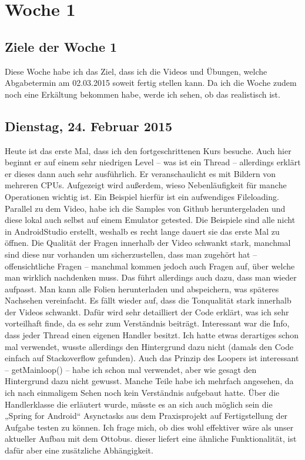 \documentclass[12pt,a4paper,bibliography=totocnumbered,listof=totocnumbered]{scrartcl}
\begin{document}
\pagebreak

\section{Woche 1}

\subsection{Ziele der Woche 1}
Diese Woche habe ich das Ziel, dass ich die Videos und Übungen, welche Abgabetermin am 02.03.2015 soweit fertig stellen kann. Da ich die Woche zudem noch eine Erkältung bekommen habe, werde ich sehen, ob das realistisch ist.

\subsection{Dienstag, 24. Februar 2015}
Heute ist das erste Mal, dass ich den fortgeschrittenen Kurs besuche. Auch hier beginnt er auf einem sehr niedrigen Level – was ist ein Thread – allerdings erklärt er dieses dann auch sehr ausführlich. Er veranschaulicht es mit Bildern von mehreren CPUs. Aufgezeigt wird außerdem, wieso Nebenläufigkeit für manche Operationen wichtig ist. Ein Beispiel hierfür ist ein aufwendiges Fileloading. 
Parallel zu dem Video, habe ich die Samples von Github heruntergeladen und diese lokal auch selbst auf einem Emulator getested. Die Beispiele sind alle nicht in AndroidStudio erstellt, weshalb es recht lange dauert sie das erste Mal zu öffnen. 
Die Qualität der Fragen innerhalb der Video schwankt stark, manchmal sind diese nur vorhanden um sicherzustellen, dass man zugehört hat – offensichtliche Fragen – manchmal kommen jedoch auch Fragen auf, über welche man wirklich nachdenken muss. Das führt allerdings auch dazu, dass man wieder aufpasst. 
Man kann alle Folien herunterladen und abspeichern, was späteres Nachsehen vereinfacht.
Es fällt wieder auf, dass die Tonqualität stark innerhalb der Videos schwankt. Dafür wird sehr detailliert der Code erklärt, was ich sehr vorteilhaft finde, da es sehr zum Verständnis beiträgt. 
Interessant war die Info, dass jeder Thread einen eigenen Handler besitzt. Ich hatte etwas derartiges schon mal verwendet, wusste allerdings den Hintergrund dazu nicht (damals den Code einfach auf Stackoverflow gefunden). Auch das Prinzip des Loopers ist interessant – getMainloop() – habe ich schon mal verwendet, aber wie gesagt den Hintergrund dazu nicht gewusst. Manche Teile habe ich mehrfach angesehen, da ich nach einmaligem Sehen noch kein Verständnis aufgebaut hatte.
Über die Handlerklasse die erläutert wurde, müsste es an sich auch möglich sein die „Spring for Android“ Asynctasks aus dem Praxisprojekt auf Fertigstellung der Aufgabe testen zu können. Ich frage mich, ob dies wohl effektiver wäre als unser aktueller Aufbau mit dem Ottobus. dieser liefert eine ähnliche Funktionalität, ist dafür aber eine zusätzliche Abhängigkeit. 
\end{document}
